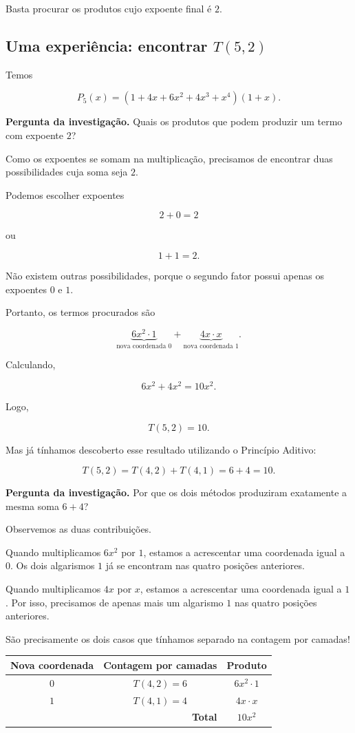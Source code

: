 \documentclass[11pt,a4paper,oneside]{book}
\newcommand{\Pergunta}[1]{\begin{perguntabox}\textbf{Pergunta da investigação.} #1\end{perguntabox}}
\renewcommand\arraystretch{1.18}
\begin{document}
Basta procurar os produtos cujo expoente
final é $2$.

\subsection*{Uma experiência: encontrar $T(5,2)$}

Temos

\[
P_5(x)=
(1+4x+6x^2+4x^3+x^4)(1+x).
\]

\Pergunta{Quais os produtos que podem
produzir um termo com expoente $2$?}

Como os expoentes se somam na multiplicação,
precisamos de encontrar duas possibilidades
cuja soma seja $2$.

Podemos escolher expoentes

\[
2+0=2
\]

ou

\[
1+1=2.
\]

Não existem outras possibilidades,
porque o segundo fator possui apenas
os expoentes $0$ e $1$.

Portanto, os termos procurados são

\[
\underbrace{6x^2\cdot1}_{\text{nova coordenada }0}
+
\underbrace{4x\cdot x}_{\text{nova coordenada }1}.
\]

Calculando,

\[
6x^2+4x^2=10x^2.
\]

Logo,

\[
\boxed{T(5,2)=10}.
\]

Mas já tínhamos descoberto esse resultado
utilizando o Princípio Aditivo:

\[
T(5,2)=T(4,2)+T(4,1)=6+4=10.
\]

\Pergunta{Por que os dois métodos produziram
exatamente a mesma soma $6+4$?}

Observemos as duas contribuições.

Quando multiplicamos $6x^2$ por $1$,
estamos a acrescentar uma coordenada igual a $0$.
Os dois algarismos $1$ já se encontram
nas quatro posições anteriores.

Quando multiplicamos $4x$ por $x$,
estamos a acrescentar uma coordenada igual a $1$.
Por isso, precisamos de apenas mais um
algarismo $1$ nas quatro posições anteriores.

São precisamente os dois casos que
tínhamos separado na contagem por camadas!

\begin{center}
\renewcommand{\arraystretch}{1.5}
\begin{tabular}{c|c|c}
\hline
\textbf{Nova coordenada}
& \textbf{Contagem por camadas}
& \textbf{Produto}\\
\hline
$0$ & $T(4,2)=6$ & $6x^2\cdot1$\\
$1$ & $T(4,1)=4$ & $4x\cdot x$\\
\hline
\multicolumn{2}{r|}{\textbf{Total}}
& $10x^2$\\
\hline
\end{tabular}
\end{center}
\end{document}
